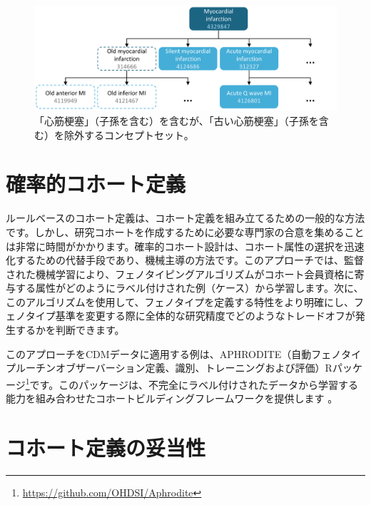 \documentclass[
  11pt]{book}
\theoremstyle{definition}
\theoremstyle{definition}
\theoremstyle{definition}
\theoremstyle{definition}
\theoremstyle{remark}
\begin{document}
\begin{figure}

{\centering \includegraphics[width=1\linewidth]{images/Cohorts/conceptSet} 

}

\caption{「心筋梗塞」（子孫を含む）を含むが、「古い心筋梗塞」（子孫を含む）を除外するコンセプトセット。}\label{fig:conceptSet}
\end{figure}

\section{確率的コホート定義}\label{ux78baux7387ux7684ux30b3ux30dbux30fcux30c8ux5b9aux7fa9}

ルールベースのコホート定義は、コホート定義を組み立てるための一般的な方法です。しかし、研究コホートを作成するために必要な専門家の合意を集めることは非常に時間がかかります。確率的コホート設計は、コホート属性の選択を迅速化するための代替手段であり、機械主導の方法です。このアプローチでは、監督された機械学習により、フェノタイピングアルゴリズムがコホート会員資格に寄与する属性がどのようにラベル付けされた例（ケース）から学習します。次に、このアルゴリズムを使用して、フェノタイプを定義する特性をより明確にし、フェノタイプ基準を変更する際に全体的な研究精度でどのようなトレードオフが発生するかを判断できます。 

このアプローチをCDMデータに適用する例は、APHRODITE（自動フェノタイプルーチンオブザーバーション定義、識別、トレーニングおよび評価）Rパッケージ\footnote{\url{https://github.com/OHDSI/Aphrodite}}です。このパッケージは、不完全にラベル付けされたデータから学習する能力を組み合わせたコホートビルディングフレームワークを提供します \citep{Banda2017APHRODITE} 。

\section{コホート定義の妥当性}\label{ux30b3ux30dbux30fcux30c8ux5b9aux7fa9ux306eux59a5ux5f53ux6027}
\end{document}
